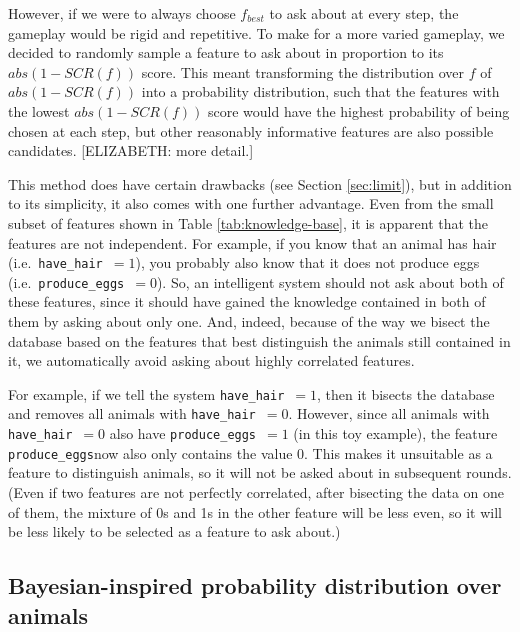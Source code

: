 \documentclass[11pt,a4paper]{article}
\newcommand{\havehair}{\texttt{have\_hair}}
\newcommand{\produceeggs}{\texttt{produce\_eggs}}
\begin{document}
However, if we were to always choose $f_{best}$ to ask about at every step, the gameplay would be rigid and repetitive.
To make for a more varied gameplay, we decided to randomly sample a feature to ask about in proportion to its $abs(1 - SCR(f))$ score. 
This meant transforming the distribution over $f$ of $abs(1 - SCR(f))$ into a probability distribution, such that the features with the lowest $abs(1 - SCR(f))$ score would have the highest probability of being chosen at each step, but other reasonably informative features are also possible candidates.
[ELIZABETH: more detail.]

This method does have certain drawbacks (see Section \ref{sec:limit}), but in addition to its simplicity, it also comes with one further advantage.
Even from the small subset of features shown in Table \ref{tab:knowledge-base}, it is apparent that the features are not independent.
For example, if you know that an animal has hair (i.e.\ \havehair\ $= 1$), you probably also know that it does not produce eggs (i.e.\ \produceeggs\ $= 0$).
So, an intelligent system should not ask about both of these features, since it should have gained the knowledge contained in both of them by asking about only one.
And, indeed, because of the way we bisect the database based on the features that best distinguish the animals still contained in it, we automatically avoid asking about highly correlated features.

For example, if we tell the system \havehair\ $= 1$, then it bisects the database and removes all animals with \havehair\ $= 0$.
However, since all animals with \havehair\ $= 0$ also have \produceeggs\ $= 1$ (in this toy example), the feature \produceeggs now also only contains the value 0.
This makes it unsuitable as a feature to distinguish animals, so it will not be asked about in subsequent rounds.
(Even if two features are not perfectly correlated, after bisecting the data on one of them, the mixture of 0s and 1s in the other feature will be less even, so it will be less likely to be selected as a feature to ask about.)

\subsection{Bayesian-inspired probability distribution over animals}
\label{subsec:yprobdist}
\end{document}
